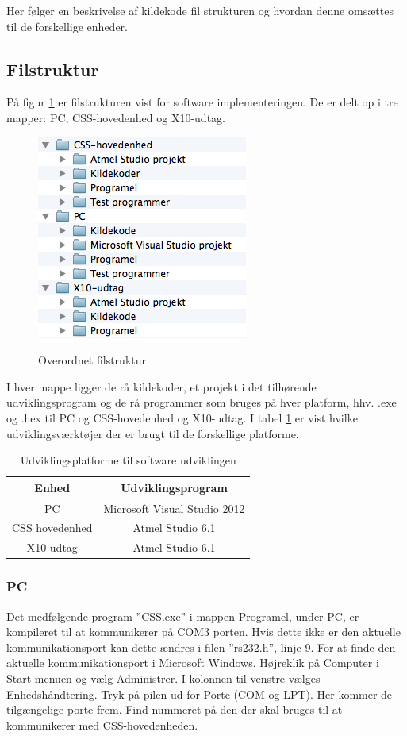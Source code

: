 Her følger en beskrivelse af kildekode fil strukturen og hvordan denne omsættes til de forskellige enheder.

\subsection{Filstruktur}
På figur \ref{fig:filstruktur1} er filstrukturen vist for software implementeringen.
De er delt op i tre mapper: PC, CSS-hovedenhed og X10-udtag.

\begin{figure}[!htb]
     \centering
     { \includegraphics{billeder/Filstruktur1}}
     \caption{Overordnet filstruktur}
     \label{fig:filstruktur1}
\end{figure}

I hver mappe ligger de rå kildekoder, et projekt i det tilhørende udviklingsprogram og de rå programmer som bruges på hver platform, hhv. .exe og .hex til PC og CSS-hovedenhed og X10-udtag.
I tabel \ref{table:Udviklingsprogrammer} er vist hvilke udviklingsværktøjer der er brugt til de forskellige platforme.

\begin{table}[htb]
	\caption{Udviklingsplatforme til software udviklingen}
	\centering
	\begin{tabular}{|c|c|}
		\hline 
		\textbf{Enhed} & \textbf{Udviklingsprogram} \\ 
		\hline 
		PC & Microsoft Visual Studio 2012 \\ 
		\hline 
		CSS hovedenhed & Atmel Studio 6.1 \\ 
		\hline 
		X10 udtag & Atmel Studio 6.1 \\ 
		\hline 
	\end{tabular} 
	\label{table:Udviklingsprogrammer}
\end{table}

\subsubsection{PC}
Det medfølgende program ''CSS.exe'' i mappen Programel, under PC, er kompileret til at kommunikerer på COM3 porten. Hvis dette ikke er den aktuelle kommunikationsport kan dette ændres i filen ''rs232.h'', linje 9. For at finde den aktuelle kommunikationsport i Microsoft Windows. Højreklik på Computer i Start menuen og vælg Administrer. I kolonnen til venstre vælges Enhedshåndtering. Tryk på pilen ud for Porte (COM og LPT). Her kommer de tilgængelige porte frem. Find nummeret på den der skal bruges til at kommunikerer med CSS-hovedenheden.

